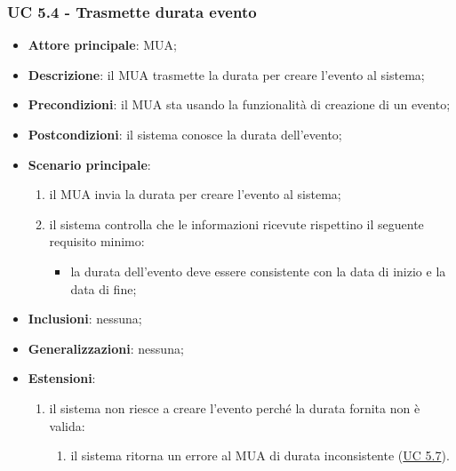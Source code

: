     \subsubsection{UC 5.4 - Trasmette durata evento} \label{sec:UC5.4}
    \begin{itemize}
        \item \textbf{Attore principale}: MUA;
        \item \textbf{Descrizione}: il MUA trasmette la durata per creare l'evento al sistema;
        \item \textbf{Precondizioni}: il MUA sta usando la funzionalità di creazione di un evento;
        \item \textbf{Postcondizioni}: il sistema conosce la durata dell'evento;
        \item \textbf{Scenario principale}:
            \begin{enumerate}
                \item il MUA invia la durata per creare l'evento al sistema;
                \item il sistema controlla che le informazioni ricevute rispettino il seguente requisito minimo:
                    \begin{itemize}
                        \item la durata dell'evento deve essere consistente con la data di inizio e la data di fine;
                    \end{itemize}
            \end{enumerate}
        \item \textbf{Inclusioni}: nessuna;
        \item \textbf{Generalizzazioni}: nessuna;
        \item \textbf{Estensioni}:
            \begin{enumerate}[label=\alph*.]
                \item il sistema non riesce a creare l'evento perché la durata fornita non è valida:
                \begin{enumerate}[label=\arabic*.]
                    \item il sistema ritorna un errore al MUA di durata inconsistente (\hyperref[sec:UC5.7]{UC 5.7}).
                \end{enumerate}
            \end{enumerate}
    \end{itemize}


